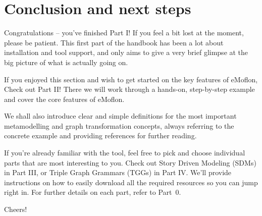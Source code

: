 \newpage
\hypertarget{conclusion}{} 
\section{Conclusion and next steps}
\genHeader

Congratulations -- you've finished Part I! If you feel a bit lost at the moment, please be patient. This first part of the handbook has been a lot about
installation and tool support, and only aims to give a very brief glimpse at the big picture of what is actually going on.

If you enjoyed this section and wish to get started on the key features of eMoflon, Check out Part II! There we will work through a hands-on, step-by-step
example and cover the core features of eMoflon.

We shall also introduce clear and simple definitions for the most important metamodelling and graph transformation concepts, always referring to the concrete
example and providing references for further reading.

If you're already familiar with the tool, feel free to pick and choose individual parts that are most interesting to you. Check out Story Driven Modeling (SDMs)
in Part III, or Triple Graph Grammars (TGGs) in Part IV. We'll provide instructions on how to easily download all the required resources so you can jump
right in. For further details on each part, refer to Part~0.

Cheers!